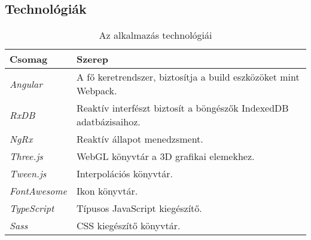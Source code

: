 










































\subsection{Technológiák}

\begin{table}[H]
	\centering
	\begin{tabular}{ | m{} | m{} | }
		\hline
		\textbf{Csomag} & \textbf{Szerep} \\
		\hline \hline
		\emph{Angular} \cite{Angular} & A fő keretrendszer, biztosítja a build eszközöket mint Webpack. \\
		\hline
		\emph{RxDB} \cite{RxDB} & Reaktív interfészt biztosít a böngészők IndexedDB adatbázisaihoz. \\
		\hline
		\emph{NgRx} \cite{NgRx} & Reaktív állapot menedzsment. \\
		\hline
		\emph{Three.js} \cite{Three} & WebGL könyvtár a 3D grafikai elemekhez. \\
		\hline
		\emph{Tween.js} \cite{Tween} & Interpolációs könyvtár. \\
		\hline
		\emph{FontAwesome} \cite{FontAwesome} & Ikon könyvtár.  \\
		\hline
		\emph{TypeScript} \cite{TypeScript} & Típusos JavaScript kiegészítő.  \\
		\hline

		\emph{Sass} \cite{Sass} & CSS kiegészítő könyvtár.  \\
		\hline
	\end{tabular}
	\caption{Az alkalmazás technológiái}
	\label{tab:technologies}
\end{table}

